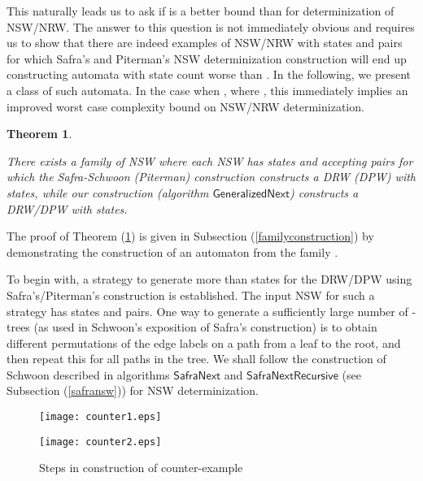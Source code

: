 \documentclass[3p]{elsarticle}
\newtheorem{theorem}{Theorem}
\newcommand{\algo}[1]{\ensuremath{\textsf{{#1}}}}
\begin{document}
This naturally leads us to ask if  is a better bound
than  for determinization of NSW/NRW. The answer to
this question is not immediately obvious and requires us to show that
there are indeed examples of NSW/NRW with  states and  pairs
for which Safra's and Piterman's NSW determinization construction will
end up constructing automata with state count worse than . In the following, we present a class of such automata. In the
case when , where , this immediately implies an
improved worst case complexity bound on NSW/NRW determinization.




\begin{theorem}
\label{familyimprovedbound}

There exists a family  of NSW where each NSW  has  states and  accepting pairs for which the
Safra-Schwoon (Piterman) construction constructs a DRW (DPW) with
 states, while our construction (algorithm
\algo{GeneralizedNext}) constructs a DRW/DPW with  states.


\end{theorem}

The proof of Theorem (\ref{familyimprovedbound}) is given in Subsection
(\ref{familyconstruction}) by demonstrating the construction of an automaton
from the family .
 
To begin with, a strategy to generate more than  states for
the DRW/DPW using Safra's/Piterman's construction is established. The input NSW
for such a strategy has  states and  pairs.  One way to generate a
sufficiently large number of -trees (as used in Schwoon's exposition of
Safra's construction) is to obtain different permutations of the edge labels on
a path from a leaf to the root, and then repeat this for all paths in the tree.
We shall follow the construction of Schwoon\cite{2001automata} described in
algorithms \algo{SafraNext} and \algo{SafraNextRecursive} (see Subsection
(\ref{safransw})) for NSW determinization.

\begin{figure}[ht]
\begin{minipage}[b]{0.48\linewidth}
\begin{center}
\texttt{[image: counter1.eps]}
\end{center}
\label{counterex1}
\end{minipage}
\hspace{5mm}
\begin{minipage}[b]{0.48\linewidth}
\begin{center}
\texttt{[image: counter2.eps]}
\end{center}
\label{counterex2}
\end{minipage}
\caption{Steps in construction of counter-example}
\label{counterex12}
\end{figure}
\end{document}
